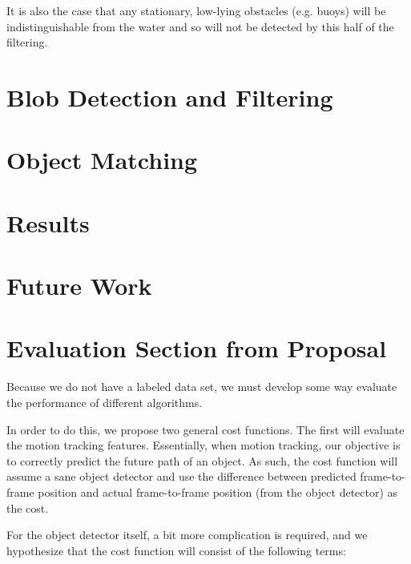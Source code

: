 \documentclass{article}
\begin{document}
It is also the case that any stationary, low-lying obstacles (e.g. buoys)
will be indistinguishable from the water and so will not be detected
by this half of the filtering.

\section{Blob Detection and Filtering}

\section{Object Matching}

\section{Results}

\section{Future Work}

\section{Evaluation Section from Proposal}

Because we do not have a labeled data set, we must develop
some way evaluate the performance of different algorithms.

In order to do this, we propose two general cost functions.
The first will evaluate the motion tracking features.
Essentially, when motion tracking, our objective is to
correctly predict the future path of an object. As such,
the cost function will assume a sane object detector and
use the difference between predicted frame-to-frame position
and actual frame-to-frame position (from the object detector)
as the cost.

For the object detector itself, a bit more complication is
required, and we hypothesize that the cost function will
consist of the following terms:
\end{document}
